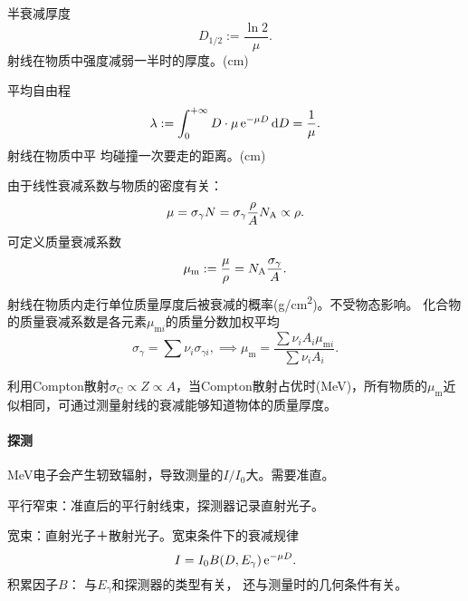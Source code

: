 半衰减厚度
\[
	D_{1/2}:=\frac{\ln 2}\mu.
\]
射线在物质中强度减弱一半时的厚度。(cm)


平均自由程
\[
	\lambda:=\int_0^{+\infty} D\cdot\mu \mathop{}\!\mathrm{e}^{-\mu D}\mathop{}\!\mathrm{d} D=\frac1\mu.
\]
射线在物质中平
均碰撞一次要走的距离。(cm)

由于线性衰减系数与物质的密度有关：
\[
	\mu=\sigma_\gamma N=\sigma_\gamma\frac\rho{A}N_{\mathrm A}\propto\rho.
\]
可定义质量衰减系数
\begin{align}
	\mu_\mathrm m:=\frac\mu\rho=N_{\mathrm A}\frac{\sigma_\gamma}A.
\end{align}
射线在物质内走行单位质量厚度后被衰减的概率(\si{g/cm^2})。不受物态影响。
化合物的质量衰减系数是各元素$\mu_{\mathrm mi}$的质量分数加权平均
\[
	\sigma_\gamma=\sum\nu_i\sigma_{\gamma i},\implies\mu_\mathrm m=\frac{\sum\nu_iA_i\mu_{\mathrm mi}}{\sum\nu_iA_i}.
\]

利用Compton散射$\sigma_\mathrm C\propto Z\propto A$，当Compton散射占优时(MeV)，所有物质的$\mu_\mathrm m$近似相同，可通过测量射线的衰减能够知道物体的质量厚度。

\paragraph{探测}
MeV电子会产生轫致辐射，导致测量的$I/I_0$大。需要准直。

平行窄束：准直后的平行射线束，探测器记录直射光子。

宽束：直射光子＋散射光子。宽束条件下的衰减规律
\[
	I=I_0B(D,E_\gamma)\mathop{}\!\mathrm{e}^{-\mu D}.
\]
积累因子$B$：
与$E_\gamma$和探测器的类型有关，
还与测量时的几何条件有关。


